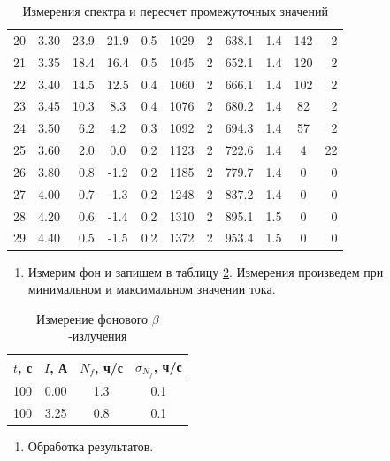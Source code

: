 \documentclass[a4paper,12pt]{article}
\begin{document}
\begin{table}[!ht]
\begin{tabular}{|l|r|r|cr|cr|cr|cr|}
        20 & 3.30 & 23.9 & 21.9 & 0.5 & 1029 & 2 & 638.1 & 1.4 & 142 & 2 \\
        21 & 3.35 & 18.4 & 16.4 & 0.5 & 1045 & 2 & 652.1 & 1.4 & 120 & 2 \\
        22 & 3.40 & 14.5 & 12.5 & 0.4 & 1060 & 2 & 666.1 & 1.4 & 102 & 2 \\
        23 & 3.45 & 10.3 & 8.3 & 0.4 & 1076 & 2 & 680.2 & 1.4 & 82 & 2 \\
        24 & 3.50 & 6.2 & 4.2 & 0.3 & 1092 & 2 & 694.3 & 1.4 & 57 & 2 \\
        25 & 3.60 & 2.0 & 0.0 & 0.2 & 1123 & 2 & 722.6 & 1.4 & 4 & 22 \\
        26 & 3.80 & 0.8 & -1.2 & 0.2 & 1185 & 2 & 779.7 & 1.4 & 0 & 0 \\
        27 & 4.00 & 0.7 & -1.3 & 0.2 & 1248 & 2 & 837.2 & 1.4 & 0 & 0 \\
        28 & 4.20 & 0.6 & -1.4 & 0.2 & 1310 & 2 & 895.1 & 1.5 & 0 & 0 \\
        29 & 4.40 & 0.5 & -1.5 & 0.2 & 1372 & 2 & 953.4 & 1.5 & 0 & 0 \\ \hline
        \end{tabular}
    \caption{Измерения спектра и пересчет промежуточных значений}
    \label{table:full_data}
\end{table}



\begin{enumerate}[resume]
    \item Измерим фон и запишем в таблицу \ref{table:background}. Измерения произведем при минимальном и максимальном значении тока.
\end{enumerate}

\begin{table}[!ht]
    \centering
    \begin{tabular}{|l|c|c|c|}
         \hline
         $t$, с & $I$, А & $N_f$, ч/с & $\sigma_{N_f}$, ч/с \\ \hline
         100    & 0.00   & 1.3        & 0.1                 \\ \hline
         100    & 3.25   & 0.8        & 0.1                 \\ \hline
    \end{tabular}
    \caption{Измерение фонового $\beta$-излучения}
    \label{table:background}
\end{table}



\begin{enumerate}[resume]
    \item Обработка результатов.
\end{enumerate}
\end{document}
